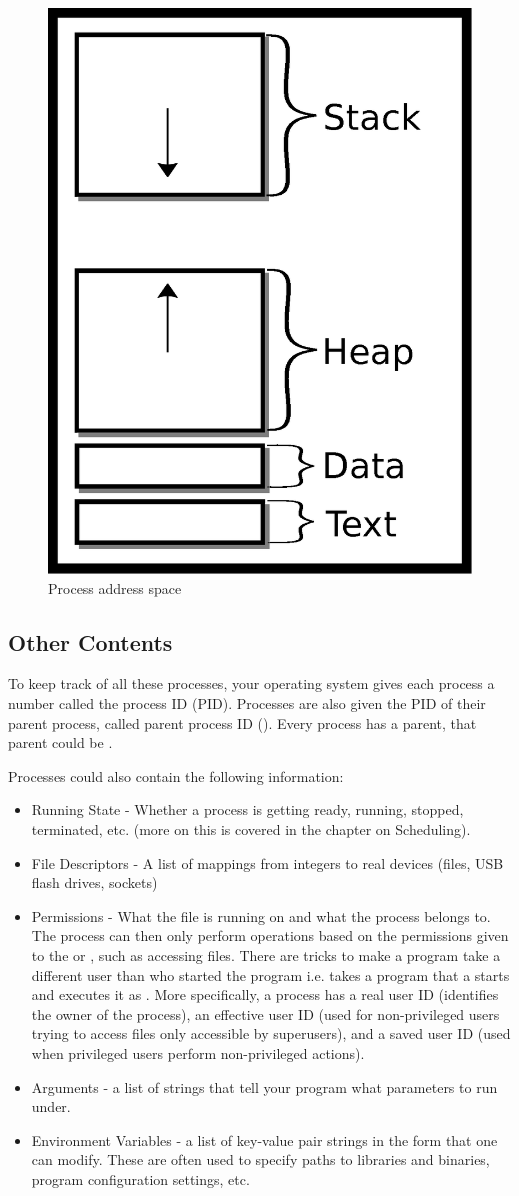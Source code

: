 \begin{figure}[H]
\centering
\includegraphics[width=.3\textwidth]{processes/drawings/address_space.eps}
\caption{Process address space}
\end{figure}



\subsection{Other Contents}

To keep track of all these processes, your operating system gives each process a number called the process ID (PID).
Processes are also given the PID of their parent process, called parent process ID ().
Every process has a parent, that parent could be .

Processes could also contain the following information:

\begin{itemize}
    \item Running State - Whether a process is getting ready, running, stopped, terminated, etc. (more on this is covered in the chapter on Scheduling).
    \item File Descriptors - A list of mappings from integers to real devices (files, USB flash drives, sockets)
    \item Permissions - What  the file is running on and what  the process belongs to.
          The process can then only perform operations based on the permissions given to the  or , such as accessing files.
          There are tricks to make a program take a different user than who started the program i.e.  takes a program that a  starts and executes it as .
          More specifically, a process has a real user ID (identifies the owner of the process), an effective user ID (used for non-privileged users trying to access files only accessible by superusers), and a saved user ID (used when privileged users perform non-privileged actions).
    \item Arguments - a list of strings that tell your program what parameters to run under.
    \item Environment Variables - a list of key-value pair strings in the form  that one can modify. These are often used to specify paths to libraries and binaries, program configuration settings, etc.
\end{itemize}

